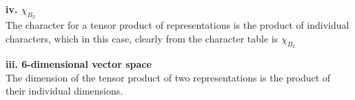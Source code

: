 \begin{alphaparts}

    \questionpart \textbf{iv. $\chi_{B_2}$}\\
    The character for a tensor product of representations is the product of
    individual characters, which in this case, clearly from the character table
    is $\chi_{B_2}$

    \questionpart \textbf{iii. 6-dimensional vector space}\\
    The dimension of the tensor product of two representations is the product
    of their individual dimensions.

\end{alphaparts}